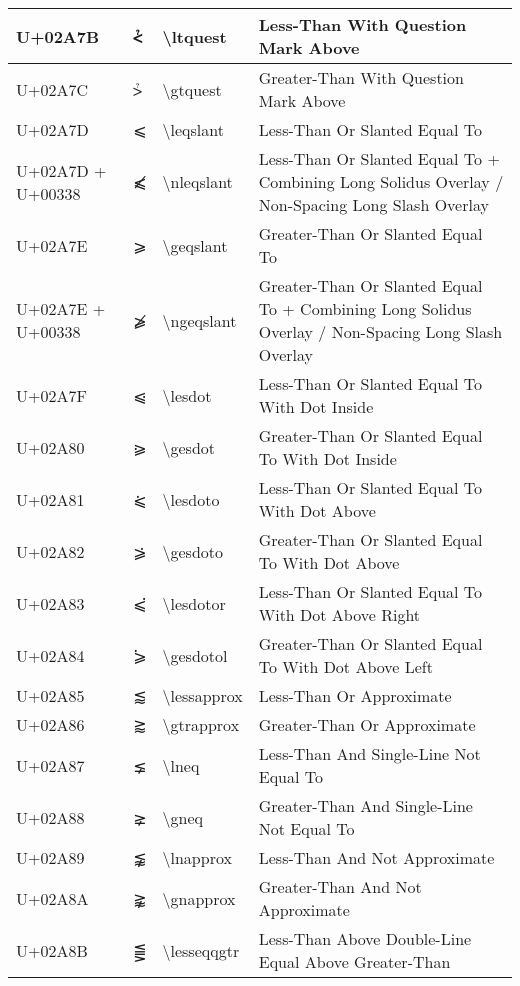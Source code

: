 \begin{table}[h]
\begin{tabulary}{\linewidth}{|L|L|L|L|}
\hline
U+02A7B & ⩻ & {\textbackslash}ltquest & Less-Than With Question Mark Above \\
\hline
U+02A7C & ⩼ & {\textbackslash}gtquest & Greater-Than With Question Mark Above \\
\hline
U+02A7D & ⩽ & {\textbackslash}leqslant & Less-Than Or Slanted Equal To \\
\hline
U+02A7D + U+00338 & ⩽̸ & {\textbackslash}nleqslant & Less-Than Or Slanted Equal To + Combining Long Solidus Overlay / Non-Spacing Long Slash Overlay \\
\hline
U+02A7E & ⩾ & {\textbackslash}geqslant & Greater-Than Or Slanted Equal To \\
\hline
U+02A7E + U+00338 & ⩾̸ & {\textbackslash}ngeqslant & Greater-Than Or Slanted Equal To + Combining Long Solidus Overlay / Non-Spacing Long Slash Overlay \\
\hline
U+02A7F & ⩿ & {\textbackslash}lesdot & Less-Than Or Slanted Equal To With Dot Inside \\
\hline
U+02A80 & ⪀ & {\textbackslash}gesdot & Greater-Than Or Slanted Equal To With Dot Inside \\
\hline
U+02A81 & ⪁ & {\textbackslash}lesdoto & Less-Than Or Slanted Equal To With Dot Above \\
\hline
U+02A82 & ⪂ & {\textbackslash}gesdoto & Greater-Than Or Slanted Equal To With Dot Above \\
\hline
U+02A83 & ⪃ & {\textbackslash}lesdotor & Less-Than Or Slanted Equal To With Dot Above Right \\
\hline
U+02A84 & ⪄ & {\textbackslash}gesdotol & Greater-Than Or Slanted Equal To With Dot Above Left \\
\hline
U+02A85 & ⪅ & {\textbackslash}lessapprox & Less-Than Or Approximate \\
\hline
U+02A86 & ⪆ & {\textbackslash}gtrapprox & Greater-Than Or Approximate \\
\hline
U+02A87 & ⪇ & {\textbackslash}lneq & Less-Than And Single-Line Not Equal To \\
\hline
U+02A88 & ⪈ & {\textbackslash}gneq & Greater-Than And Single-Line Not Equal To \\
\hline
U+02A89 & ⪉ & {\textbackslash}lnapprox & Less-Than And Not Approximate \\
\hline
U+02A8A & ⪊ & {\textbackslash}gnapprox & Greater-Than And Not Approximate \\
\hline
U+02A8B & ⪋ & {\textbackslash}lesseqqgtr & Less-Than Above Double-Line Equal Above Greater-Than \\

\end{tabulary}
\end{table}
